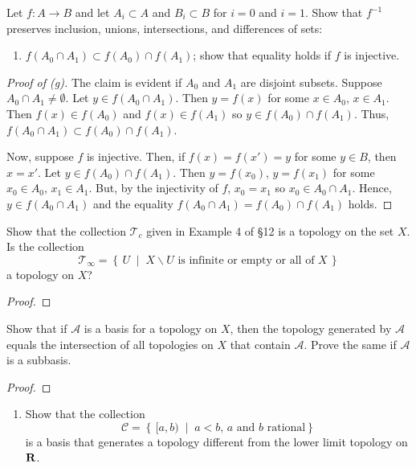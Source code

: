 \begin{problem}[Munkres, \S2, 2(g).]
Let $f\colon A\to B$ and let $A_i\subset A$ and $B_i\subset B$
for $i=0$ and $i=1$. Show that $f^{-1}$ preserves inclusion,
unions, intersections, and differences of sets:
\begin{enumerate}[noitemsep]
\item[(g)] $f(A_0\cap A_1)\subset f(A_0)\cap f(A_1)$; show that
  equality holds if $f$ is injective.
\end{enumerate}
\end{problem}
\begin{proof}[Proof of (g)]
The claim is evident if $A_0$ and $A_1$ are disjoint
subsets. Suppose $A_0\cap A_1\neq\emptyset$. Let $y\in f(A_0\cap
A_1)$. Then $y=f(x)$ for some $x\in A_0$, $x\in A_1$. Then
$f(x)\in f(A_0)$ and $f(x)\in f(A_1)$ so $y\in f(A_0)\cap
f(A_1)$. Thus, $f(A_0\cap A_1)\subset f(A_0)\cap f(A_1)$.

Now, suppose $f$ is injective. Then, if $f(x)=f(x')=y$ for some
$y\in B$, then $x=x'$. Let $y\in f(A_0)\cap f(A_1)$. Then
$y=f(x_0)$, $y=f(x_1)$ for some $x_0\in A_0$, $x_1\in A_1$. But,
by the injectivity of $f$, $x_0=x_1$ so $x_0\in A_0\cap
A_1$. Hence, $y\in f(A_0\cap A_1)$ and the equality $f(A_0\cap
A_1)=f(A_0)\cap f(A_1)$ holds.
\end{proof}
\newpage

\begin{problem}[Munkres, \S13, 3.]
Show that the collection ${\mathcal{T}}_c$ given in Example 4 of
\S12 is a topology on the set $X$. Is the collection
\[
{\mathcal{T}}_\infty=
\left\{\,U\;\middle|\;
\text{$X\smallsetminus U$ is infinite or empty or all of $X$}
\,\right\}
\]
a topology on $X$?
\end{problem}
\begin{proof}

\end{proof}
\newpage

\begin{problem}[Munkres, \S13, 5.]
Show that if $\mathcal{A}$ is a basis for a topology on $X$, then
the topology generated by $\mathcal{A}$ equals the intersection
of all topologies on $X$ that contain $\mathcal{A}$. Prove the
same if $\mathcal{A}$ is a subbasis.
\end{problem}
\begin{proof}
\end{proof}
\newpage

\begin{problem}[Munkres, \S13, 8(b).]
\begin{enumerate}[noitemsep]
\item[(b)] Show that the collection
\[\mathcal{C}=\left\{\,[a,b)\;\middle|\;\text{$a<b$, $a$ and $b$ rational}\right\}\]
is a basis that generates a topology different from the lower
limit topology on ${\operatorname{\mathbf{R}}}$.
\end{enumerate}
\end{problem}
\newpage

